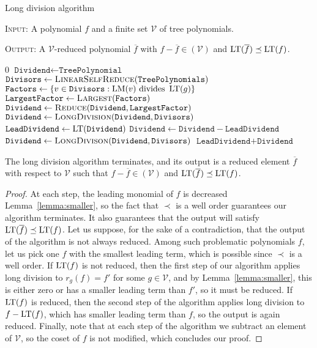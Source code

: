 \begin{algorithm}
\caption{Long division algorithm}\label{euclid}
\textsc{Input:} A polynomial $f$ and a finite set $\mathcal V$
of tree polynomials.

\textsc{Output:} A $\mathcal V$-reduced polynomial $\overline{f}$ with $f-\overline{f} \in (\mathcal V)$ and $\operatorname{LT}(\overline{f})
\preceq \operatorname{LT}(f)$.
\begin{adjustwidth}{1 cm}{1 cm}
\begin{algorithmic}[1]
 \Return $0$
	 \Else
	 \State $\texttt{Dividend} \gets \texttt{TreePolynomial}$
	 \State $\texttt{Divisors} \gets 
	 	\textsc{LinearSelfReduce}(\texttt{TreePolynomials})$
	 \State $\texttt{Factors} \gets \{ v\in \texttt{Divisors} :\operatorname{LM}(v) \text{ divides } \operatorname{LT}(g)\}$
	\State $\texttt{LargestFactor}\gets \textsc{Largest}(\texttt{Factors})$   
	\State $\texttt{Dividend}\gets \textsc{Reduce}(\texttt{Dividend},\texttt{LargestFactor})$ 
	\State $\texttt{Dividend}\gets \textsc{LongDivision}(\texttt{Dividend},\texttt{Divisors})$  
		\EndIf
	\State $\texttt{LeadDividend} \gets \operatorname{LT}(\texttt{Dividend})$
	\State $\texttt{Dividend} \gets \texttt{Dividend}-\texttt{LeadDividend}$
	\State $\texttt{Dividend} \gets \textsc{LongDivison}(\texttt{Dividend},\texttt{Divisors})$
	\EndIf
	\State \Return $\texttt{LeadDividend} + \texttt{Dividend}$
\EndProcedure
\end{algorithmic}
\end{adjustwidth}
\end{algorithm}


\begin{lemma}
The long division algorithm terminates, and its
output is a reduced element $\overline{f}$ with respect to $\mathcal
V$ such that $f-\overline{f} \in (\mathcal V)$ and $\operatorname{LT}(\overline{f})
\preceq \operatorname{LT}(f)$.
\end{lemma}


\begin{proof}
At each step, the leading monomial of $f$ is decreased Lemma~\ref{lemma:smaller},
so the fact that $\prec$ is a well order guarantees our algorithm
terminates. It also guarantees that the output will satisfy
$\operatorname{LT}(\overline{f}) \preceq \operatorname{LT}(f)$. Let us suppose, for the sake
of a contradiction, that the output of the algorithm is not
always reduced. Among such problematic polynomials $f$,
let us pick one $f$ with the smallest leading term, which is
possible since $\prec$ is a well order. If $\operatorname{LT}(f)$ is not
reduced, then the first step of our algorithm applies long
division to $r_g(f) = f'$ for some $g\in\mathcal V$, and
by Lemma~\ref{lemma:smaller}, this is either zero or has a smaller
leading term than $f'$, so it must be reduced. If $\operatorname{LT}(f)$
is reduced, then the second step of the algorithm applies long
division to $f-\operatorname{LT}(f)$, which has smaller leading term than
$f$, so the output is again reduced. Finally, note that
at each step of the algorithm we subtract an element of
$\mathcal V$, so the coset of $f$ is not modified,
which concludes our proof.
\end{proof}


